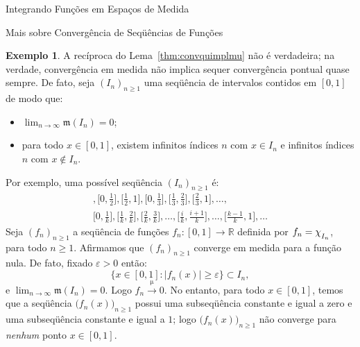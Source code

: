 \documentclass[oneside,final,11pt]{amsbook}
\newcommand{\R}{\mathds R}
\newcommand{\leb}{\mathfrak m}
\newcommand{\chilow}[1]{\chi_{\lower2pt\hbox{$\scriptstyle#1$}}}
\newcommand{\To}[1]{\xrightarrow{\;\mathrm{#1}\;}}
\theoremstyle{remark}\newtheorem{exercise}{Exercício}[chapter]
\theoremstyle{remark}\newtheorem{*exercise}[exercise]{\hbox to 0pt{\hskip 0pt minus 1fil*}Exercício}
\theoremstyle{definition}\newtheorem{exdefin}{Definição}[chapter]
\theoremstyle{plain}\newtheorem{teo}{Teorema}[section]
\theoremstyle{plain}\newtheorem{lem}[teo]{Lema}
\theoremstyle{plain}\newtheorem{prop}[teo]{Proposição}
\theoremstyle{plain}\newtheorem{cor}[teo]{Corolário}
\theoremstyle{definition}\newtheorem{defin}[teo]{Definição}
\theoremstyle{remark}\newtheorem{rem}[teo]{Observação}
\theoremstyle{definition}\newtheorem{notation}[teo]{Notação}
\theoremstyle{definition}\newtheorem{convention}[teo]{Convenção}
\theoremstyle{definition}\newtheorem{example}[teo]{Exemplo}
\numberwithin{section}{chapter}
\numberwithin{equation}{section}
\begin{document}
\begin{chapter}{Integrando Funções em Espaços de Medida}
\begin{section}{Mais sobre Convergência de Seqüências de Funções}
\begin{example}
A recíproca do Lema~\ref{thm:convquimplmu} não é verdadeira; na verdade, convergência em medida não implica
sequer convergência pontual quase sempre. De fato, seja $(I_n)_{n\ge1}$ uma seqüência de intervalos contidos
em $[0,1]$ de modo que:
\begin{itemize}
\item $\lim_{n\to\infty}\leb(I_n)=0$;
\item para todo $x\in[0,1]$, existem infinitos índices $n$ com $x\in I_n$ e infinitos índices $n$ com $x\not\in I_n$.
\end{itemize}
Por exemplo, uma possível seqüência $(I_n)_{n\ge1}$ é:
\begin{multline*}
[0,1],\big[0,\tfrac12\big],\big[\tfrac12,1\big],\big[0,\tfrac13\big],\big[\tfrac13,\tfrac23\big],
\big[\tfrac23,1\big],\ldots,\\
\big[0,\tfrac1k\big],\big[\tfrac1k,\tfrac2k\big],\big[\tfrac2k,\tfrac3k\big],\ldots,\big[\tfrac ik,\tfrac{i+1}k\big],\ldots,
\big[\tfrac{k-1}k,1\big],\ldots
\end{multline*}
Seja $(f_n)_{n\ge1}$ a seqüência de funções $f_n:[0,1]\to\R$ definida por $f_n=\chilow{I_n}$, para todo $n\ge1$.
Afirmamos que $(f_n)_{n\ge1}$ converge em medida para a função nula. De fato, fixado $\varepsilon>0$ então:
\[\big\{x\in[0,1]:\big\vert f_n(x)\big\vert\ge\varepsilon\big\}\subset I_n,\]
e $\lim_{n\to\infty}\leb(I_n)=0$. Logo $f_n\To\mu0$. No entanto, para todo $x\in[0,1]$, temos que a seqüência
$\big(f_n(x)\big)_{n\ge1}$ possui uma subseqüência constante e igual a zero e uma subseqüência constante e igual a $1$;
logo $\big(f_n(x)\big)_{n\ge1}$ não converge para {\em nenhum\/} ponto $x\in[0,1]$.
\end{example}


\end{section}
\end{chapter}
\end{document}
